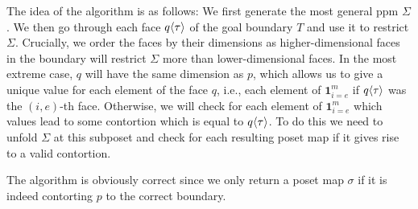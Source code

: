 \documentclass[11pt]{article}
\theoremstyle{definition}
\newcommand{\mdef}{:=}
\newcommand{\pint}[1]{\mathbf{1}^{#1}}
\newcommand{\pintrestr}[3]{\mathbf{1}^{#1}_{{#2}={#3}}}
\newcommand{\izero}{\mathsf{0}}
\newcommand{\ione}{\mathsf{1}}
\renewcommand{\dim}[1]{\mathsf{dim}({#1})}
\newcommand{\cont}[2]{\ensuremath{ \ifthenelse{\equal{#2}{}}{#1}{{#1}\langle{#2}\rangle}} }
\newcommand{\boundary}[1]{\partial({#1})}
\begin{document}
The idea of the algorithm is as follows: We first generate the most general ppm
$\Sigma$. We then go through each face $\cont{q}{\tau}$ of the goal boundary $T$
and use it to restrict $\Sigma$. Crucially, we order the faces by their
dimensions as higher-dimensional faces in the boundary will restrict $\Sigma$
more than lower-dimensional faces. In the most extreme case, $q$ will have the
same dimension as $p$, which allows us to give a unique value for each element
of the face $q$, i.e., each element of $\pintrestr{m}{i}{e}$ if $\cont{q}{\tau}$ was
the $(i,e)$-th face. Otherwise, we will check for each element of $\pintrestr{m}{i}{e}$ which
values lead to some contortion which is equal to $\cont{q}{\tau}$. To do this we
need to unfold $\Sigma$ at this subposet and check for each resulting poset map
if it gives rise to a valid contortion.

The algorithm is obviously correct since we only return a poset map $\sigma$ if
it is indeed contorting $p$ to the correct boundary.





\end{document}
